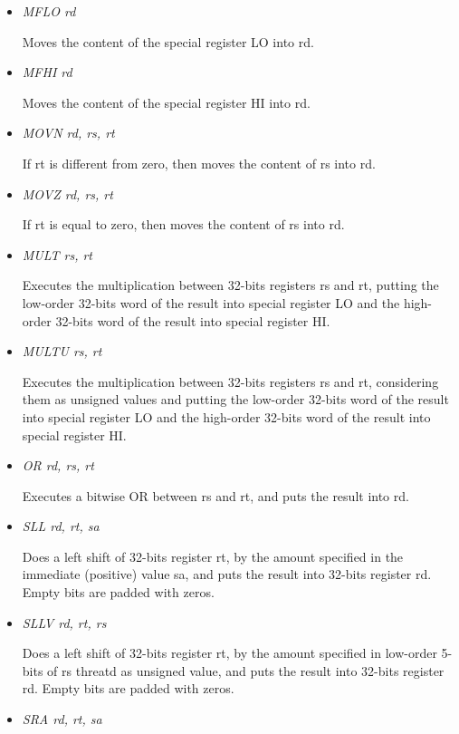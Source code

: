 \documentclass[letterpaper,10pt,english]{sphinxmanual}
\begin{document}
\begin{itemize}
\item {} 
\emph{MFLO rd}

Moves the content of the special register LO into rd.

\item {} 
\emph{MFHI rd}

Moves the content of the special register HI into rd.

\item {} 
\emph{MOVN rd, rs, rt}

If rt is different from zero, then moves the content of rs into rd.

\item {} 
\emph{MOVZ rd, rs, rt}

If rt is equal to zero, then moves the content of rs into rd.

\item {} 
\emph{MULT rs, rt}

Executes the multiplication between 32-bits registers rs and rt, putting the low-order 32-bits word of the result into special register LO and the high-order 32-bits word of the result into special register HI.

\item {} 
\emph{MULTU rs, rt}

Executes the multiplication between 32-bits registers rs and rt, considering them as unsigned values and putting the low-order 32-bits word of the result into special register LO and the high-order 32-bits word of the result into special register HI.

\item {} 
\emph{OR rd, rs, rt}

Executes a bitwise OR between rs and rt, and puts the result into rd.

\item {} 
\emph{SLL rd, rt, sa}

Does a left shift of 32-bits register rt, by the amount specified in the immediate (positive) value sa, and puts the result into 32-bits register rd. Empty bits are padded with zeros.

\item {} 
\emph{SLLV rd, rt, rs}

Does a left shift of 32-bits register rt, by the amount specified in low-order 5-bits of rs threatd as unsigned value, and puts the result into 32-bits register rd. Empty bits are padded with zeros.

\item {} 
\emph{SRA rd, rt, sa}


\end{itemize}
\end{document}
